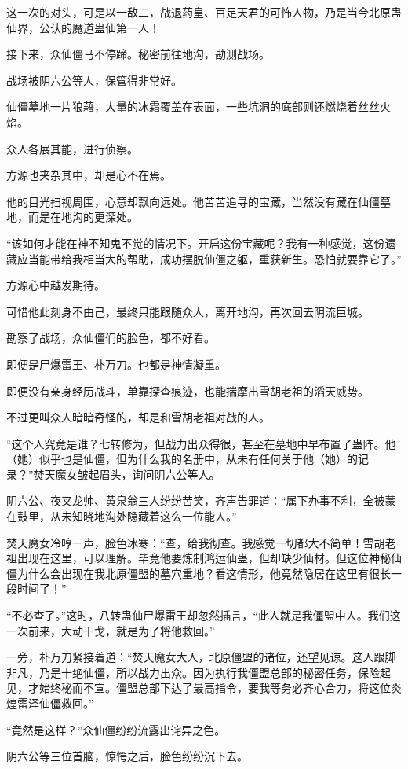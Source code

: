 \begin{this_body}
这一次的对头，可是以一敌二，战退药皇、百足天君的可怖人物，乃是当今北原蛊仙界，公认的魔道蛊仙第一人！

接下来，众仙僵马不停蹄。秘密前往地沟，勘测战场。

战场被阴六公等人，保管得非常好。

仙僵墓地一片狼藉，大量的冰霜覆盖在表面，一些坑洞的底部则还燃烧着丝丝火焰。

众人各展其能，进行侦察。

方源也夹杂其中，却是心不在焉。

他的目光扫视周围，心意却飘向远处。他苦苦追寻的宝藏，当然没有藏在仙僵墓地，而是在地沟的更深处。

“该如何才能在神不知鬼不觉的情况下。开启这份宝藏呢？我有一种感觉，这份遗藏应当能带给我相当大的帮助，成功摆脱仙僵之躯，重获新生。恐怕就要靠它了。”

方源心中越发期待。

可惜他此刻身不由己，最终只能跟随众人，离开地沟，再次回去阴流巨城。

勘察了战场，众仙僵们的脸色，都不好看。

即便是尸爆雷王、朴万刀。也都是神情凝重。

即便没有亲身经历战斗，单靠探查痕迹，也能揣摩出雪胡老祖的滔天威势。

不过更叫众人暗暗奇怪的，却是和雪胡老祖对战的人。

“这个人究竟是谁？七转修为，但战力出众得很，甚至在墓地中早布置了蛊阵。他（她）似乎也是仙僵，但为什么我的名册中，从未有任何关于他（她）的记录？”焚天魔女皱起眉头，询问阴六公等人。

阴六公、夜叉龙帅、黄泉翁三人纷纷苦笑，齐声告罪道：“属下办事不利，全被蒙在鼓里，从未知晓地沟处隐藏着这么一位能人。”

焚天魔女冷哼一声，脸色冰寒：“查，给我彻查。我感觉一切都大不简单！雪胡老祖出现在这里，可以理解。毕竟他要炼制鸿运仙蛊，但却缺少仙材。但这位神秘仙僵为什么会出现在我北原僵盟的墓穴重地？看这情形，他竟然隐居在这里有很长一段时间了！”

“不必查了。”这时，八转蛊仙尸爆雷王却忽然插言，“此人就是我僵盟中人。我们这一次前来，大动干戈，就是为了将他救回。”

一旁，朴万刀紧接着道：“焚天魔女大人，北原僵盟的诸位，还望见谅。这人跟脚非凡，乃是十绝仙僵，所以战力出众。因为执行我僵盟总部的秘密任务，保险起见，才始终秘而不宣。僵盟总部下达了最高指令，要我等务必齐心合力，将这位炎煌雷泽仙僵救回。”

“竟然是这样？”众仙僵纷纷流露出诧异之色。

阴六公等三位首脑，惊愕之后，脸色纷纷沉下去。


\end{this_body}

